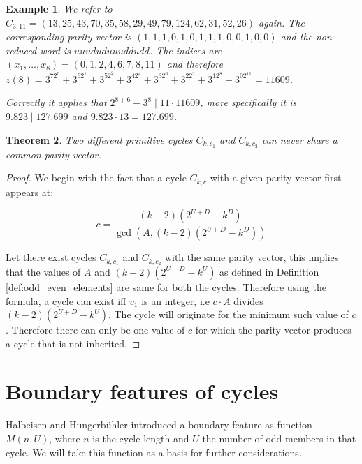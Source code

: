 \documentclass[12pt]{amsart}
\newtheorem{theorem}{Theorem}[section]
\newtheorem{example}[theorem]{Example}
\theoremstyle{definition}
\begin{document}
\begin{example}
We refer to $C_{3,11}=(13,25,43,70,35,58,29,49,79,124,62,31,52,26)$ again. The corresponding parity vector is $(1,1,1,0,1,0,1,1,1,0,0,1,0,0)$ and the non-reduced word is $uuududuuuddudd$. The indices are $(x_1,\ldots,x_8)=(0,1,2,4,6,7,8,11)$ and therefore $z(8)=3^72^0+3^62^1+3^52^2+3^42^4+3^32^6+3^22^7+3^12^8+3^02^{11}=11609$.

\par\medskip\noindent
Correctly it applies that $2^{8+6}-3^8\mid11\cdot11609$, more specifically it is $9.823\mid127.699$ and $9.823\cdot13=127.699$. 
\end{example}

\begin{theorem}
\label{theo:cycle_uniqueness}
Two different primitive cycles $C_{k,c_1}$ and $C_{k,c_2}$ can never share a common parity vector.
\end{theorem}

\begin{proof}
We begin with the fact that a cycle $C_{k,c}$ with a given parity vector first appears at:

\[
c=\frac{(k-2)(2^{U+D}-k^{D})}{\gcd(A,(k-2)(2^{U+D}-k^{D}))}
\]

\par\medskip
Let there exist cycles $C_{k,c_1}$ and $C_{k,c_2}$ with the same parity vector, this implies that the values of $A$ and $(k-2)(2^{U+D}-k^{U})$ as defined in Definition \ref{def:odd_even_elements} are same for both the cycles. Therefore using the formula, a cycle can exist iff $v_1$ is an integer, i.e $c \cdot A$ divides $(k-2)(2^{U+D}-k^{U})$. The cycle will originate for the minimum such value of $c$. Therefore there can only be one value of $c$ for which the parity vector produces a cycle that is not inherited.
\end{proof}


\section{Boundary features of cycles}
Halbeisen and Hungerbühler \cite{Ref_Halbeisen_Hungerbuehler_1997} introduced a boundary feature as function $M(n,U)$, where $n$ is the cycle length and $U$ the number of odd members in that cycle. We will take this function as a basis for further considerations.
\end{document}
